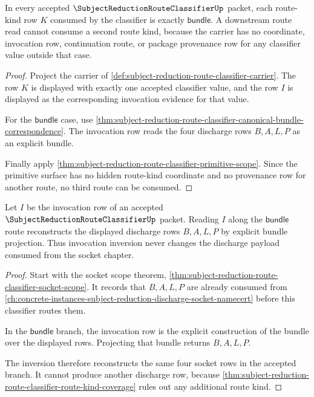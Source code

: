 \begin{theorem}
\label{thm:subject-reduction-route-classifier-route-kind-coverage}
In every accepted $\SubjectReductionRouteClassifierUp$ packet, each route-kind row $K$ consumed by the classifier is exactly $\mathsf{bundle}$. A downstream route read cannot consume a second route kind, because the carrier has no coordinate, invocation row, continuation route, or package provenance row for any classifier value outside that case.
\end{theorem}
\begin{proof}
Project the carrier of \autoref{def:subject-reduction-route-classifier-carrier}. The row $K$ is displayed with exactly one accepted classifier value, and the row $I$ is displayed as the corresponding invocation evidence for that value.

For the $\mathsf{bundle}$ case, use \autoref{thm:subject-reduction-route-classifier-canonical-bundle-correspondence}. The invocation row reads the four discharge rows $B,A,L,P$ as an explicit bundle.



Finally apply \autoref{thm:subject-reduction-route-classifier-primitive-scope}. Since the primitive surface has no hidden route-kind coordinate and no provenance row for another route, no third route can be consumed.
\end{proof}

\begin{theorem}
\label{thm:subject-reduction-route-classifier-invocation-payload-inversion}
Let $I$ be the invocation row of an accepted $\SubjectReductionRouteClassifierUp$ packet. Reading $I$ along the $\mathsf{bundle}$ route reconstructs the displayed discharge rows $B,A,L,P$ by explicit bundle projection. Thus invocation inversion never changes the discharge payload consumed from the socket chapter.
\end{theorem}
\begin{proof}
Start with the socket scope theorem, \autoref{thm:subject-reduction-route-classifier-socket-scope}. It records that $B,A,L,P$ are already consumed from \autoref{ch:concrete-instances-subject-reduction-discharge-socket-namecert} before this classifier routes them.

In the $\mathsf{bundle}$ branch, the invocation row is the explicit construction of the bundle over the displayed rows. Projecting that bundle returns $B,A,L,P$.



The inversion therefore reconstructs the same four socket rows in the accepted branch. It cannot produce another discharge row, because \autoref{thm:subject-reduction-route-classifier-route-kind-coverage} rules out any additional route kind.
\end{proof}

